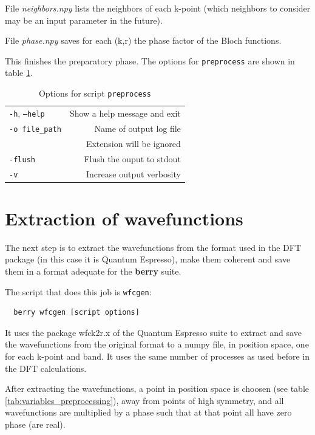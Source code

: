 \documentclass[a4paper,12pt]{report}
\begin{document}
File \emph{neighbors.npy} lists the neighbors of each k-point
(which neighbors to consider may be an input parameter in the future).

File \emph{phase.npy} saves for each (k,r) the phase factor of the Bloch functions.

This finishes the preparatory phase.
The options for \texttt{preprocess} are shown in table \ref{tab:options_preprocess}.

\begin{table}[h]
 \centering
 \caption{Options for script \texttt{preprocess}}\label{tab:options_preprocess}
\begin{tabular}[]{lr}
\hline
  \texttt{-h}, \texttt{--help}  &\hspace*{2cm} Show a help message and exit \\
  \texttt{-o file\_path}        & Name of output log file\\
                                & Extension will be ignored \\
  \texttt{-flush}               & Flush the ouput to stdout \\
  \texttt{-v}                   & Increase output verbosity \\
  \hline
\end{tabular}
\end{table}


\section{Extraction of wavefunctions}

The next step is to extract the wavefunctions from the format used in the DFT package
(in this case it is {\sc Quantum Espresso}),
make them coherent and save them in a format adequate for the \textbf{berry} suite.

The script that does this job is \texttt{wfcgen}:
\begin{verbatim}
  berry wfcgen [script options]
\end{verbatim}

It uses the package wfck2r.x of the {\sc Quantum Espresso} suite to extract and save the wavefunctions
from the original format to a numpy file, in position space, one for each k-point and band.
It uses the same number of processes as used before in the DFT calculations.

After extracting the wavefunctions,
 a point in position space is choosen (see table \ref{tab:variables_preprocessing}),
away from points of high symmetry, and all wavefunctions
are multiplied by a phase such that at that point all have zero phase (are real).
\end{document}
